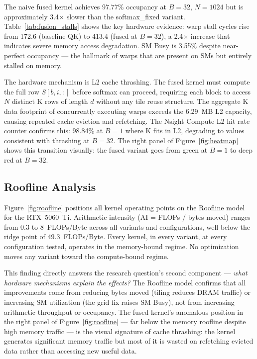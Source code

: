 \documentclass{article}
\begin{document}
The naive fused kernel achieves 97.77\% occupancy at $B{=}32$, $N{=}1024$
but is approximately 3.4$\times$ slower than the softmax\_fixed variant.
Table~\ref{tab:fusion_stalls} shows the key hardware evidence: warp stall
cycles rise from 172.6 (baseline QK) to 413.4 (fused at $B{=}32$), a
2.4$\times$ increase that indicates severe memory access degradation.
SM Busy is 3.55\% despite near-perfect occupancy — the hallmark of warps
that are present on SMs but entirely stalled on memory.

The hardware mechanism is L2 cache thrashing. The fused kernel must compute
the full row $S[b,i,:]$ before softmax can proceed, requiring each block to
access $N$ distinct K rows of length $d$ without any tile reuse structure.
The aggregate K data footprint of concurrently executing warps exceeds the
6.29~MB L2 capacity, causing repeated cache eviction and refetching. The
Nsight Compute L2 hit rate counter confirms this: 98.84\% at $B{=}1$ where
K fits in L2, degrading to values consistent with thrashing at $B{=}32$.
The right panel of Figure~\ref{fig:heatmap} shows this transition visually:
the fused variant goes from green at $B{=}1$ to deep red at $B{=}32$.

\subsection{Roofline Analysis}

Figure~\ref{fig:roofline} positions all kernel operating points on the
Roofline model for the RTX~5060~Ti. Arithmetic intensity (AI = FLOPs /
bytes moved) ranges from 0.3 to 8~FLOPs/Byte across all variants and
configurations, well below the ridge point of 49.3~FLOPs/Byte. Every
kernel, in every variant, at every configuration tested, operates in the
memory-bound regime. No optimization moves any variant toward the
compute-bound regime.

This finding directly answers the research question's second component —
\textit{what hardware mechanisms explain the effects?} The Roofline model
confirms that all improvements come from reducing bytes moved (tiling
reduces DRAM traffic) or increasing SM utilization (the grid fix raises
SM Busy), not from increasing arithmetic throughput or occupancy. The fused
kernel's anomalous position in the right panel of Figure~\ref{fig:roofline}
— far below the memory roofline despite high memory traffic — is the visual
signature of cache thrashing: the kernel generates significant memory traffic
but most of it is wasted on refetching evicted data rather than accessing
new useful data.
\end{document}
